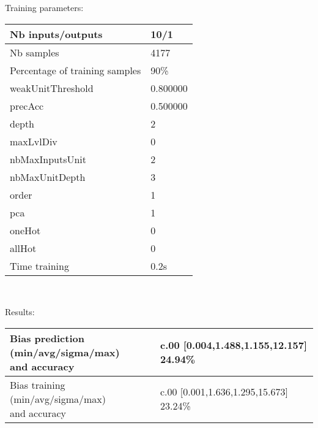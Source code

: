 Training parameters:\\
\begin{center}
\begin{tabular}{|l|l|}
\hline
Nb inputs/outputs&10/1\\
\hline
Nb samples&4177\\
\hline
Percentage of training samples&90\%\\
\hline
weakUnitThreshold&0.800000\\
\hline
precAcc&0.500000\\
\hline
depth&2\\
\hline
maxLvlDiv&0\\
\hline
nbMaxInputsUnit&2\\
\hline
nbMaxUnitDepth&3\\
\hline
order&1\\
\hline
pca&1\\
\hline
oneHot&0\\
\hline
allHot&0\\
\hline
Time training&0.2s\\
\hline
\end{tabular}\\
\end{center}\newline
Results:
\begin{center}
\begin{tabular}{|l|l|}
\hline
\makecell{Bias prediction (min/avg/sigma/max)\\and accuracy}&\makecell{c.00 [0.004,1.488,1.155,12.157] 24.94\%\\
}\\

\hline
\makecell{Bias training (min/avg/sigma/max)\\and accuracy}&\makecell{c.00 [0.001,1.636,1.295,15.673] 23.24\%\\
}\\
\hline
\end{tabular}\
\end{center}

